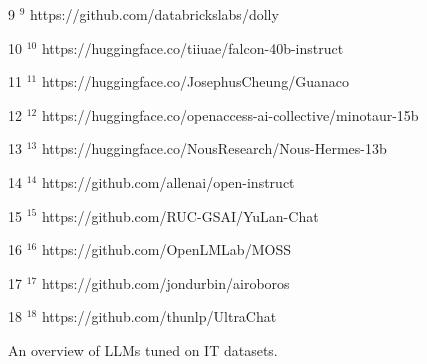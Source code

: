 \begin{table*}[t]
\begin{multicols}{2}
\begin{tablenotes}
\item[9] \label{id:9} {$^9$ https://github.com/databrickslabs/dolly}
\item[10] \label{id:10} {$^{10}$ https://huggingface.co/tiiuae/falcon-40b-instruct}
\item[11] \label{id:11} {$^{11}$ https://huggingface.co/JosephusCheung/Guanaco}
\item[12] \label{id:12} {$^{12}$ https://huggingface.co/openaccess-ai-collective/minotaur-15b}
\item[13] \label{id:13} {$^{13}$ https://huggingface.co/NousResearch/Nous-Hermes-13b } 
\item[14] \label{id:14} {$^{14}$ https://github.com/allenai/open-instruct}
\item[15] \label{id:15} {$^{15}$ https://github.com/RUC-GSAI/YuLan-Chat}
\item[16] \label{id:16} {$^{16}$ https://github.com/OpenLMLab/MOSS}
\item[17] \label{id:17} {$^{17}$ https://github.com/jondurbin/airoboros}
\item[18] \label{id:18} {$^{18}$ https://github.com/thunlp/UltraChat}

\end{tablenotes}
\end{multicols}
\caption{An overview of LLMs tuned on IT datasets.}
\label{tab:llms_table}
\end{table*}